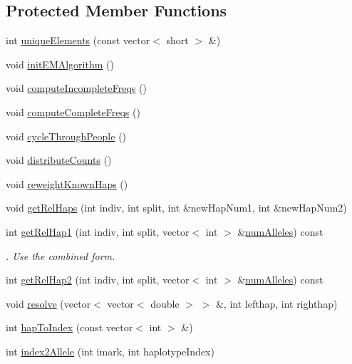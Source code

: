 \subsection*{Protected Member Functions}
\begin{DoxyCompactItemize}
\item 
int \hyperlink{classEM_a5393a49dd932245a931e6d5eece1cf27}{uniqueElements} (const vector$<$ short $>$ \&)
\item 
void \hyperlink{classEM_a8531164d0fa92217eb0c7d9f75382912}{initEMAlgorithm} ()
\item 
void \hyperlink{classEM_af7ab6d102b2901761764b91abb28d88a}{computeIncompleteFreqs} ()
\item 
void \hyperlink{classEM_a385df83b9c344ceaa000966dccc92796}{computeCompleteFreqs} ()
\item 
void \hyperlink{classEM_a65fd72ccd0f1a9ff5289e96d419fa65f}{cycleThroughPeople} ()
\item 
void \hyperlink{classEM_addc146c4cd9b7d98e01c485454544529}{distributeCounts} ()
\item 
void \hyperlink{classEM_a7a49c56e4c55158f0c1ff4ec6a9469e3}{reweightKnownHaps} ()
\item 
void \hyperlink{classEM_af63a611b10a4a1bbe15b2013d2c72b45}{getRelHaps} (int indiv, int split, int \&newHapNum1, int \&newHapNum2)
\item 
int \hyperlink{classEM_a456073e2e19b310df9ed0f953dbd6abc}{getRelHap1} (int indiv, int split, vector$<$ int $>$ \&\hyperlink{classEM_a8355d01f8998e654c32b1fc8f478ced1}{numAlleles}) const 
\begin{DoxyCompactList}\small\item\em . Use the combined form. \item\end{DoxyCompactList}\item 
int \hyperlink{classEM_a8a03279b3b78e8f88add021a28b7ac28}{getRelHap2} (int indiv, int split, vector$<$ int $>$ \&\hyperlink{classEM_a8355d01f8998e654c32b1fc8f478ced1}{numAlleles}) const 
\item 
void \hyperlink{classEM_a1bd0c351ef1ee04ad0552f2066d7f3d7}{resolve} (vector$<$ vector$<$ double $>$ $>$ \&, int lefthap, int righthap)
\item 
int \hyperlink{classEM_a3e6b256bb2996b1903f5a2490540659b}{hapToIndex} (const vector$<$ int $>$ \&)
\item 
int \hyperlink{classEM_abdb50dc221b573b78c2c9785b2ae7f9b}{index2Allele} (int imark, int haplotypeIndex)
\end{DoxyCompactItemize}
